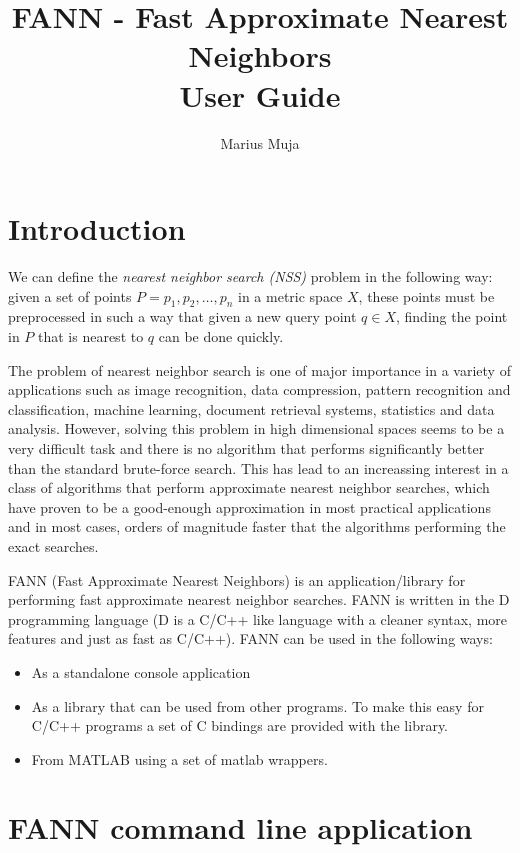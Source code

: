 \documentclass[letter,10pt]{article}
\title{FANN - Fast Approximate Nearest Neighbors\\User Guide}
\author{Marius Muja}
\begin{document}
\maketitle



\section{Introduction}

We can define the \emph{nearest neighbor search (NSS)} problem in the following way: given a set of points $P=p_1,p_2,\dots,p_n$ in a metric space $X$, these points must be preprocessed in such a way that given a new query point $q \in X$, finding the point in $P$ that is nearest to $q$ can be done quickly.

The problem of nearest neighbor search is one of major importance in a variety of applications such as image recognition, data compression, pattern recognition and classification, machine learning,  document retrieval systems, statistics and data analysis. However, solving this problem in high dimensional spaces seems to be a very difficult task and there is no algorithm that performs significantly better than the standard brute-force search. This has lead to an increassing interest in a class of algorithms that perform approximate nearest neighbor searches, which have proven to be a good-enough approximation in most practical applications and in most cases, orders of magnitude faster that the algorithms performing the exact searches.

FANN (Fast Approximate Nearest Neighbors) is an application/library for performing fast approximate nearest neighbor searches. FANN is written in the D programming language (D is a C/C++ like language with a cleaner syntax, more features and just as fast as C/C++). FANN can be used in the following ways:
\begin{itemize}
 \item As a standalone console application
\item As a library that can be used from other programs. To make this easy for C/C++ programs a set of C bindings are provided with the library.
\item From MATLAB using a set of matlab wrappers.
\end{itemize}


\section{FANN command line application}
\end{document}
